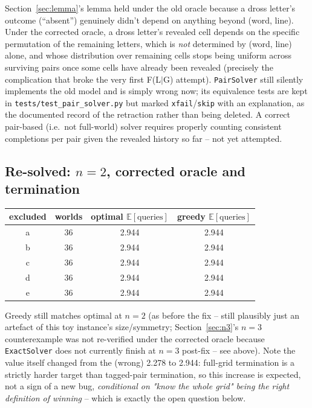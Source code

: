 \documentclass[11pt]{article}
\begin{document}
Section~\ref{sec:lemma}'s lemma held under the old oracle because a dross
letter's outcome (``absent'') genuinely didn't depend on anything beyond
(word, line). Under the corrected oracle, a dross letter's revealed cell
depends on the specific permutation of the remaining letters, which is
\emph{not} determined by (word, line) alone, and whose distribution over
remaining cells stops being uniform across surviving pairs once some cells
have already been revealed (precisely the complication that broke the very
first F(L$\mid$G) attempt). \texttt{PairSolver} still silently implements
the old model and is simply wrong now; its equivalence tests are kept in
\texttt{tests/test\_pair\_solver.py} but marked \texttt{xfail}/\texttt{skip}
with an explanation, as the documented record of the retraction rather than
being deleted. A correct pair-based (i.e.\ not full-world) solver requires
properly counting consistent completions per pair given the revealed
history so far -- not yet attempted.

\subsection{Re-solved: $n=2$, corrected oracle and termination}

\begin{center}
\begin{tabular}{cccc}
\toprule
excluded & worlds & optimal $\mathbb{E}[\text{queries}]$ & greedy $\mathbb{E}[\text{queries}]$ \\
\midrule
a & 36 & 2.944 & 2.944 \\
b & 36 & 2.944 & 2.944 \\
c & 36 & 2.944 & 2.944 \\
d & 36 & 2.944 & 2.944 \\
e & 36 & 2.944 & 2.944 \\
\bottomrule
\end{tabular}
\end{center}

Greedy still matches optimal at $n=2$ (as before the fix -- still
plausibly just an artefact of this toy instance's size/symmetry;
Section~\ref{sec:n3}'s $n=3$ counterexample was not re-verified under the
corrected oracle because \texttt{ExactSolver} does not currently finish at
$n=3$ post-fix -- see above). Note the value itself changed from the
(wrong) 2.278 to 2.944: full-grid termination is a strictly harder target
than tagged-pair termination, so this increase is expected, not a sign of
a new bug, \emph{conditional on "know the whole grid" being the right
definition of winning} -- which is exactly the open question below.
\end{document}
